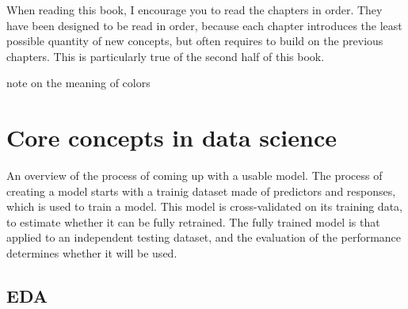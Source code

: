 \documentclass[
  letterpaper,
]{scrbook}
\begin{document}
When reading this book, I encourage you to read the chapters in order.
They have been designed to be read in order, because each chapter
introduces the least possible quantity of new concepts, but often
requires to build on the previous chapters. This is particularly true of
the second half of this book.

note on the meaning of colors

\section{Core concepts in data
science}\label{core-concepts-in-data-science}

\begin{flowchart}


\caption{\label{flw-overview}An overview of the process of coming up
with a usable model. The process of creating a model starts with a
trainig dataset made of predictors and responses, which is used to train
a model. This model is cross-validated on its training data, to estimate
whether it can be fully retrained. The fully trained model is that
applied to an independent testing dataset, and the evaluation of the
performance determines whether it will be used.}

\end{flowchart}%

\subsection{EDA}\label{eda}
\end{document}
